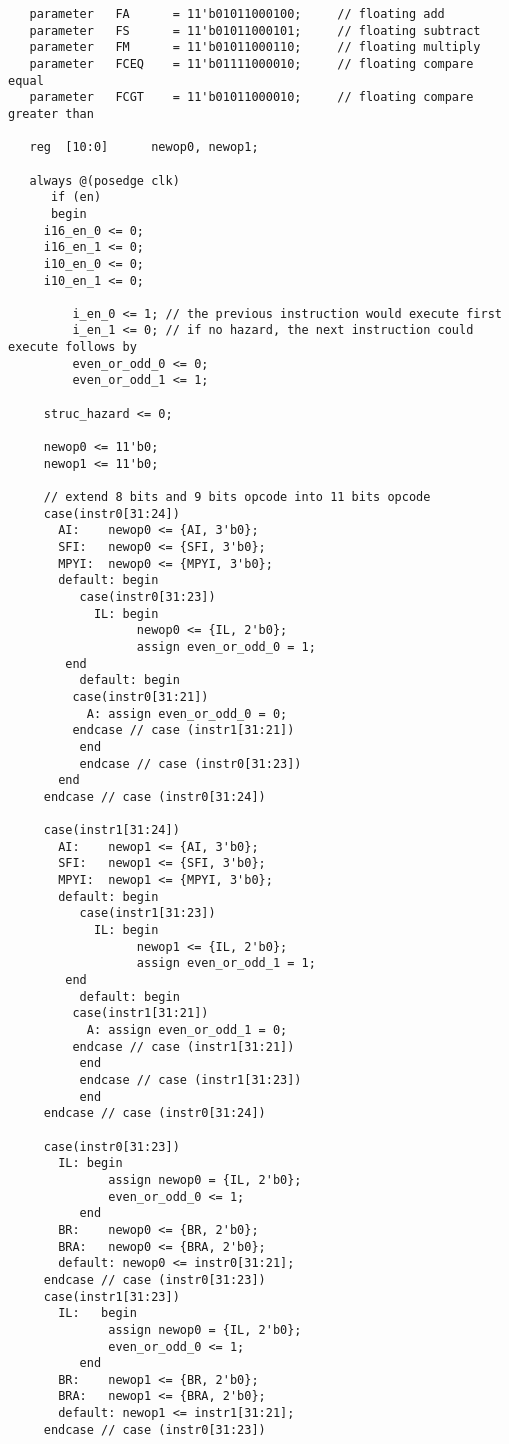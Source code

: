 \documentclass[preprint,authoryear,12pt]{elsarticle}
\begin{document}
\begin{verbatim}
   parameter   FA      = 11'b01011000100;     // floating add
   parameter   FS      = 11'b01011000101;     // floating subtract
   parameter   FM      = 11'b01011000110;     // floating multiply
   parameter   FCEQ    = 11'b01111000010;     // floating compare equal
   parameter   FCGT    = 11'b01011000010;     // floating compare greater than

   reg	[10:0]	    newop0, newop1;

   always @(posedge clk)
      if (en)
      begin
	 i16_en_0 <= 0;
	 i16_en_1 <= 0;
	 i10_en_0 <= 0;
	 i10_en_1 <= 0;

         i_en_0 <= 1; // the previous instruction would execute first
         i_en_1 <= 0; // if no hazard, the next instruction could execute follows by
         even_or_odd_0 <= 0;
         even_or_odd_1 <= 1;

	 struc_hazard <= 0;

	 newop0 <= 11'b0;
	 newop1 <= 11'b0;
	 	 
	 // extend 8 bits and 9 bits opcode into 11 bits opcode
	 case(instr0[31:24])
	   AI:    newop0 <= {AI, 3'b0};
	   SFI:   newop0 <= {SFI, 3'b0};
	   MPYI:  newop0 <= {MPYI, 3'b0};
	   default: begin
	      case(instr0[31:23])
	        IL: begin
                  newop0 <= {IL, 2'b0};
                  assign even_or_odd_0 = 1;
		end
	      default: begin
		 case(instr0[31:21])
		   A: assign even_or_odd_0 = 0;
		 endcase // case (instr1[31:21])
	      end
	      endcase // case (instr0[31:23])
	   end
	 endcase // case (instr0[31:24])
	 
	 case(instr1[31:24])
	   AI:    newop1 <= {AI, 3'b0};
	   SFI:   newop1 <= {SFI, 3'b0};
	   MPYI:  newop1 <= {MPYI, 3'b0};
	   default: begin
	      case(instr1[31:23])
	        IL: begin
                  newop1 <= {IL, 2'b0};
                  assign even_or_odd_1 = 1;
		end
	      default: begin
		 case(instr1[31:21])
		   A: assign even_or_odd_1 = 0;
		 endcase // case (instr1[31:21])
	      end
	      endcase // case (instr1[31:23])
	      end
	 endcase // case (instr0[31:24])
	 
	 case(instr0[31:23])
	   IL: begin 
              assign newop0 = {IL, 2'b0};
              even_or_odd_0 <= 1;
	      end
	   BR:    newop0 <= {BR, 2'b0};
	   BRA:   newop0 <= {BRA, 2'b0};
	   default: newop0 <= instr0[31:21];
	 endcase // case (instr0[31:23])
	 case(instr1[31:23])
	   IL:   begin 
              assign newop0 = {IL, 2'b0};
              even_or_odd_0 <= 1;
	      end
	   BR:    newop1 <= {BR, 2'b0};
	   BRA:   newop1 <= {BRA, 2'b0};
	   default: newop1 <= instr1[31:21];
	 endcase // case (instr0[31:23])


\end{verbatim}
\end{document}

